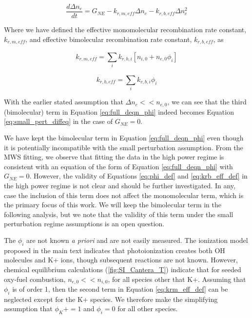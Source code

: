 \begin{equation}
  \label{eq:full_deqn_phi}
\frac{d\Delta n_{e}}{dt} = G_{NE} - k_{r, m, eff}\Delta n_{e} - k_{r, b, eff} \Delta n_{e}^2
\end{equation}

Where we have defined the effective monomolecular recombination rate constant, $k_{r, m, eff}$, and effective bimolecular recombination rate constant, $k_{r, b, eff}$, as


\begin{equation}
\label{eq:krm_eff_def}
k_{r, m, eff} = \sum_{i}^{}k_{r, b, i}[n_{i,0} + n_{e,0}\phi_i]
\end{equation}

\begin{equation}
\label{eq:krb_eff_def}
k_{r, b, eff} = \sum_{i}^{}k_{r, b, i}\phi_i
\end{equation}


With the earlier stated assumption that $\Delta n_{e} << n_{e,0}$, we can see that the third (bimolecular) term in Equation \ref{eq:full_deqn_phi} indeed becomes Equation \ref{eq:small_pert_diffeq} in the case of $G_{NE} = 0$.

We have kept the bimolecular term in Equation \ref{eq:full_deqn_phi} even though it is potentially incompatible with the small perturbation assumption. From the MWS fitting, we observe that fitting the data in the high power regime is consistent with an equation of the form of Equation \ref{eq:full_deqn_phi} with $G_{NE} = 0$. However, the validity of Equations \ref{eq:phi_def} and \ref{eq:krb_eff_def} in the high power regime is not clear and should be further investigated. In any, case the inclusion of this term does not affect the monomolecular term, which is the primary focus of this work. We will keep the bimolecular term in the following analysis, but we note that the validity of this term under the small perturbation regime assumptions is an open question.

The $\phi_i$ are not known \emph{a priori} and are not easily measured. The ionization model proposed in the main text indicates that photoionization creates both OH molecules and K+ ions, though subsequent reactions are not known. However, chemical equilibrium calculations (\ref{fig:SI_Cantera_T}) indicate that for seeded oxy-fuel combustion, $n_{e,0} << n_{i,0}$, for all species other that K+. Assuming that $\phi_i$ is of order 1, then the second term in Equation \ref{eq:krm_eff_def} can be neglected except for the K+ species. We therefore make the simplifying assumption that  $\phi_K+ = 1$ and $\phi_i = 0$ for all other species. 

